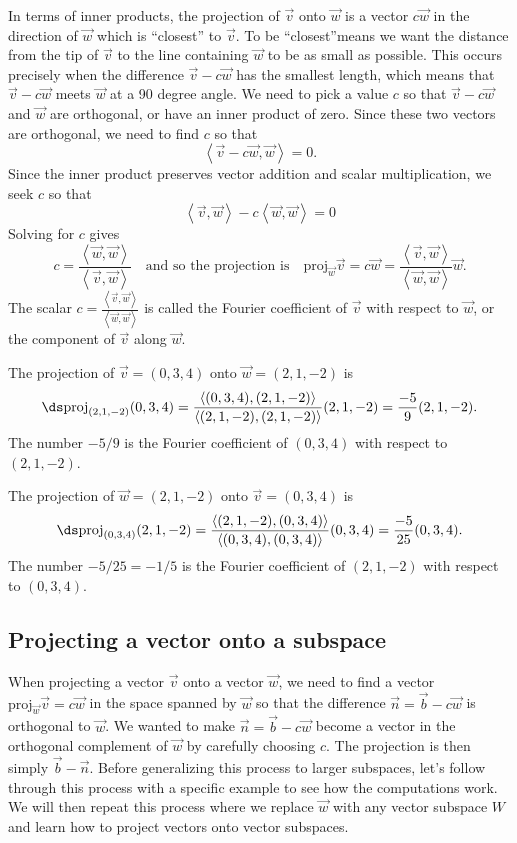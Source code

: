In terms of inner products, the projection of $\vec v$ onto $\vec w$ is a vector $c\vec w$ in the direction of $\vec w$ which is ``closest'' to $\vec v$. To be ``closest''means we want the distance from the tip of $\vec v$ to the line containing $\vec w$ to be as small as possible. This occurs precisely when the difference $\vec v-c\vec w$ has the smallest length, which means that $\vec v-c\vec w$ meets $\vec w$ at a 90 degree angle. We need to pick a value $c$ so that $\vec v-c\vec w$ and $\vec w$ are orthogonal, or have an inner product of zero.  Since these two vectors are orthogonal, we need to find $c$ so that 
$$\left<\vec v-c\vec w,\vec w\right>=0.$$
Since the inner product preserves vector addition and scalar multiplication, we seek $c$ so that
$$\left<\vec v,\vec w\right>-c\left<\vec w,\vec w\right>=0$$
Solving for $c$ gives $$ c= \frac{\left<\vec w,\vec w\right>}{\left<\vec v,\vec w\right>}\quad \text{and so the projection is}\quad 
\text{proj}_{\vec w}\vec v = c\vec w=\frac{\left<\vec v,\vec w\right>}{\left<\vec w,\vec w\right>}\vec w.
$$ 
The scalar $c=\frac{\left<\vec v,\vec w\right>}{\left<\vec w,\vec w\right>}$ is called the Fourier coefficient of $\vec v$ with respect to $\vec w$, or the component of $\vec v$ along $\vec w$.

\begin{example}
The projection of $\vec v = (0,3,4)$ onto $\vec w = (2,1,-2)$ is 
$$\ds \text{proj}_{(2,1,-2)}(0,3,4) =\frac{\left<(0,3,4),(2,1,-2)\right>}{\left<(2,1,-2),(2,1,-2)\right>}(2,1,-2) = \frac{-5}{9}(2,1,-2).$$ The number $-5/9$ is the Fourier coefficient of $(0,3,4)$ with respect to $(2,1,-2)$.

The projection of $\vec w = (2,1,-2)$  onto $\vec v = (0,3,4)$ is 
$$\ds \text{proj}_{(0,3,4)}(2,1,-2) =\frac{\left<(2,1,-2),(0,3,4)\right>}{\left<(0,3,4),(0,3,4)\right>}(0,3,4) = \frac{-5}{25}(0,3,4).$$ The number $-5/25 = -1/5$ is the Fourier coefficient of $(2,1,-2)$ with respect to $(0,3,4)$.
 
\end{example}



\subsection{Projecting a vector onto a subspace}

When projecting a vector $\vec v$ onto a vector $\vec w$, we need to find a vector $\text{proj}_{\vec w}\vec v = c\vec w$ in the space spanned by $\vec w$ so that the difference $\vec n = \vec b - c\vec w$ is orthogonal to $\vec w$.  We wanted to make $\vec n  = \vec b-c\vec w$ become a vector in the orthogonal complement of $\vec w$ by carefully choosing $c$. The projection is then simply $\vec b - \vec n$. Before generalizing this process to larger subspaces, let's follow through this process with a specific example to see how the computations work. We will then repeat this process where we replace $\vec w$ with any vector subspace $W$ and learn how to project vectors onto vector subspaces.


